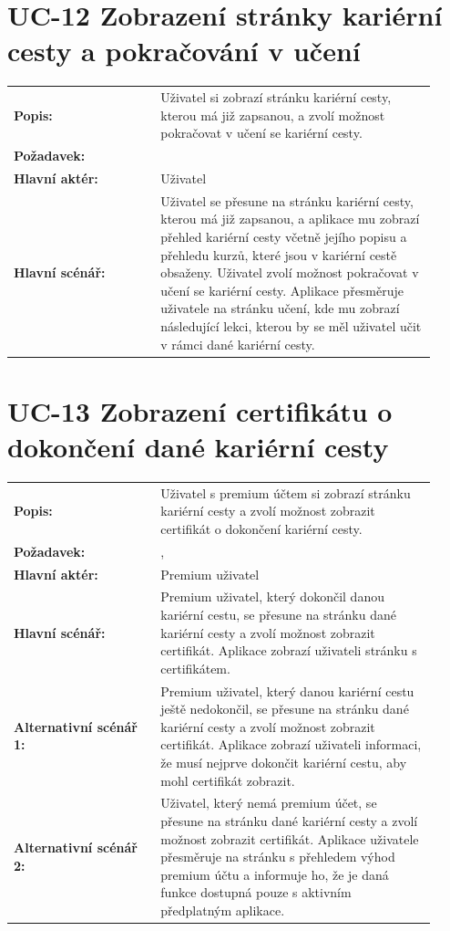 \section{UC-12 Zobrazení stránky kariérní cesty a pokračování v učení}\label{sec:uc-12}

\begin{tabular}{p{0.32\linewidth}p{0.6\linewidth}}
  \textbf{Popis:} & Uživatel si zobrazí stránku kariérní cesty, kterou má již zapsanou, a zvolí možnost pokračovat v učení se kariérní cesty. \\
  \textbf{Požadavek:} & \nameref{sec:fp-learning-paths} \\
  \textbf{Hlavní aktér:} & Uživatel \\
  \textbf{Hlavní scénář:} & Uživatel se přesune na stránku kariérní cesty, kterou má již zapsanou, a aplikace mu zobrazí přehled kariérní cesty včetně jejího popisu a přehledu kurzů, které jsou v kariérní cestě obsaženy. Uživatel zvolí možnost pokračovat v učení se kariérní cesty. Aplikace přesměruje uživatele na stránku učení, kde mu zobrazí následující lekci, kterou by se měl uživatel učit v rámci dané kariérní cesty. \\
\end{tabular}

\section{UC-13 Zobrazení certifikátu o dokončení dané kariérní cesty}\label{sec:uc-13}

\begin{tabular}{p{0.32\linewidth}p{0.6\linewidth}}
  \textbf{Popis:} & Uživatel s premium účtem si zobrazí stránku kariérní cesty a zvolí možnost zobrazit certifikát o dokončení kariérní cesty. \\
  \textbf{Požadavek:} & \nameref{sec:fp-learning-paths}, \nameref{sec:fp-subscription-system} \\
  \textbf{Hlavní aktér:} & Premium uživatel \\
  \textbf{Hlavní scénář:} & Premium uživatel, který dokončil danou kariérní cestu, se přesune na stránku dané kariérní cesty a zvolí možnost zobrazit certifikát. Aplikace zobrazí uživateli stránku s certifikátem. \\
  \textbf{Alternativní scénář 1:} & Premium uživatel, který danou kariérní cestu ještě nedokončil, se přesune na stránku dané kariérní cesty a zvolí možnost zobrazit certifikát. Aplikace zobrazí uživateli informaci, že musí nejprve dokončit kariérní cestu, aby mohl certifikát zobrazit. \\
  \textbf{Alternativní scénář 2:} & Uživatel, který nemá premium účet, se přesune na stránku dané kariérní cesty a zvolí možnost zobrazit certifikát. Aplikace uživatele přesměruje na stránku s přehledem výhod premium účtu a informuje ho, že je daná funkce dostupná pouze s aktivním předplatným aplikace. \\
\end{tabular}

